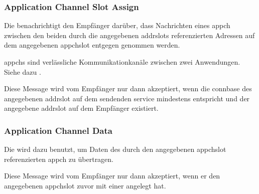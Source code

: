 \subsubsection{Application Channel Slot Assign}
\label{dcl-isproto-acsa}
Die \msg{\isprotoacsa} benachrichtigt den Empfänger darüber, dass Nachrichten eines \gls{appch} %
zwischen den beiden durch die angegebenen \glspl{addrslot} referenzierten Adressen auf dem
angegebenen \gls{appchslot} entgegen genommen werden.

\Glspl{appch} sind verlässliche Kommunikationkanäle zwischen zwei Anwendungen.
Siehe dazu .

Diese Message wird vom Empfänger nur dann akzeptiert, wenn die \gls{connbase} des angegebenen
\gls{addrslot} auf dem sendenden \gls{service} mindestens  entspricht und der
angegebene \gls{addrslot} auf dem Empfänger existiert.

\isprotoacsabytefield


\subsubsection{Application Channel Data}
\label{dcl-isproto-acd}
Die \msg{\isprotoacd} wird dazu benutzt, um Daten des durch den angegebenen \gls{appchslot} %
referenzierten \gls{appch} zu übertragen.

Diese Message wird vom Empfänger nur dann akzeptiert, wenn er den angegebenen \gls{appchslot}
zuvor mit einer \msg{\isprotoacsa} angelegt hat.

\isprotoacdbytefield
